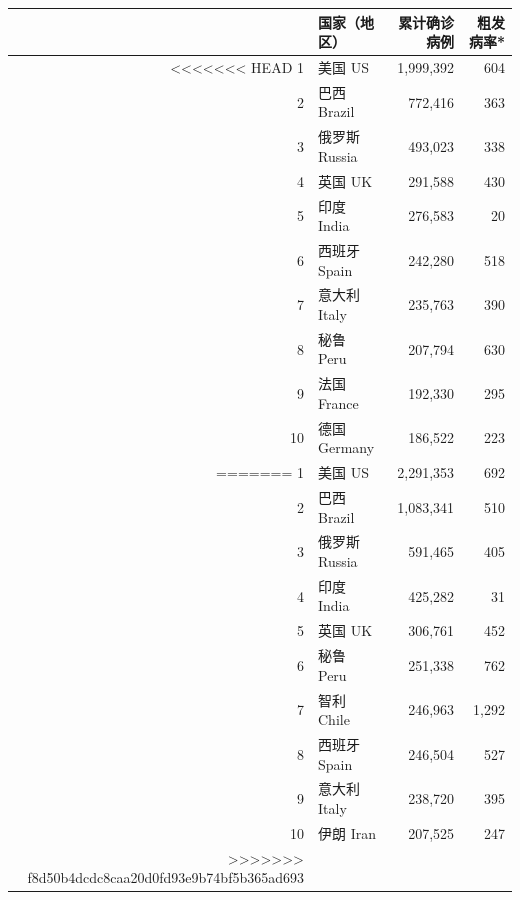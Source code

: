\documentclass[
]{article}
\begin{document}
\begin{table}[H]
    
    \begin{minipage}{.4\linewidth}
    \centering
    \captionsetup{justification=centering}
    \caption{累计确诊前十位国家}
      \vspace{-0.5\baselineskip}
      \centering
      \captionsetup{justification=centering} \begin{table}[H]
\centering
\begin{tabular}{rlrr}
\toprule
  & 国家（地区） & 累计确诊病例 & 粗发病率*\\
\midrule
<<<<<<< HEAD
\rowcolor{gray!6}  1 & 美国 US & 1,999,392 & 604\\
2 & 巴西 Brazil & 772,416 & 363\\
\rowcolor{gray!6}  3 & 俄罗斯 Russia & 493,023 & 338\\
4 & 英国 UK & 291,588 & 430\\
\rowcolor{gray!6}  5 & 印度 India & 276,583 & 20\\
6 & 西班牙 Spain & 242,280 & 518\\
\rowcolor{gray!6}  7 & 意大利 Italy & 235,763 & 390\\
8 & 秘鲁 Peru & 207,794 & 630\\
\rowcolor{gray!6}  9 & 法国 France & 192,330 & 295\\
10 & 德国 Germany & 186,522 & 223\\
=======
\rowcolor{gray!6}  1 & 美国 US & 2,291,353 & 692\\
2 & 巴西 Brazil & 1,083,341 & 510\\
\rowcolor{gray!6}  3 & 俄罗斯 Russia & 591,465 & 405\\
4 & 印度 India & 425,282 & 31\\
\rowcolor{gray!6}  5 & 英国 UK & 306,761 & 452\\
6 & 秘鲁 Peru & 251,338 & 762\\
\rowcolor{gray!6}  7 & 智利 Chile & 246,963 & 1,292\\
8 & 西班牙 Spain & 246,504 & 527\\
\rowcolor{gray!6}  9 & 意大利 Italy & 238,720 & 395\\
10 & 伊朗 Iran & 207,525 & 247\\
>>>>>>> f8d50b4dcdc8caa20d0fd93e9b74bf5b365ad693
\bottomrule
\end{tabular}
\end{table} \end{minipage}
    \begin{minipage}{.7\linewidth}

\end{minipage}
\end{table}
\end{document}
